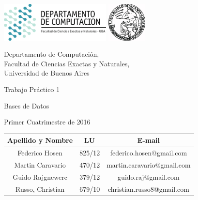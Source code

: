 \documentclass[a4paper, 10pt, twoside]{article}
\newcommand{\titulo}{Trabajo Práctico 1}
\newcommand{\materia}{Bases de Datos}
\newcommand{\cuatrimestre}{Primer Cuatrimestre de 2016}
\begin{document}


\thispagestyle{caratula}

\begin{center}

\includegraphics[height=2cm]{DC.png} 
\hfill
\includegraphics[height=2cm]{UBA.jpg} 

\vspace{2cm}

Departamento de Computación,\\
Facultad de Ciencias Exactas y Naturales,\\
Universidad de Buenos Aires

\vspace{4cm}

\begin{Huge}
\titulo
\end{Huge}

\vspace{0.5cm}

\begin{Large}
\materia
\end{Large}

\vspace{1cm}

\cuatrimestre

\vspace{4cm}

\begin{tabular}{|c|c|c|}
\hline
Apellido y Nombre & LU & E-mail\\
\hline
Federico Hosen  & 825/12 & federico.hosen@gmail.com\\
Martin Caravario  & 470/12 & martin.caravario@gmail.com\\
Guido Rajgnewerc  & 379/12 & guido.raj@gmail.com\\
Russo, Christian  & 679/10 & christian.russo8@gmail.com\\
\hline
\end{tabular}

\end{center}
\end{document}
